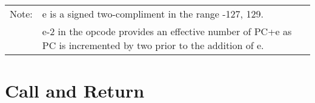 \documentclass[oneside,a4paper]{book}
\newcommand{\notet}{\rule{0pt}{2.4ex}}
\newcommand{\noteb}{\rule[-1.3ex]{0pt}{0pt}}
\begin{document}
{\begin{tabular}{llcccccccccccccccl}
		\hline

		Note:
			& \multicolumn{17}{l}{\parbox{12cm}{e is a signed two-compliment in the range -127, 129.}}\notet\noteb \\

			& \multicolumn{17}{l}{\parbox{12cm}{e-2 in the opcode provides an effective number of PC+e as PC is incremented by two prior to the addition of e.}}\noteb \\[5pt]
			
		\hline

	\end{tabular}
}


\section{Call and Return}
\end{document}
